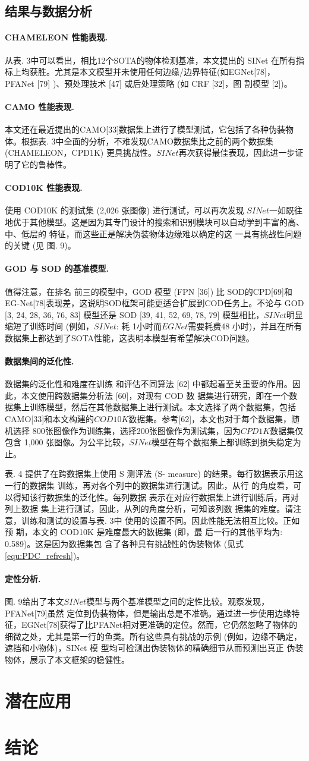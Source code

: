 \documentclass[final]{cvpr}
\newcommand{\mypara}[1]{\paragraph{#1.}}
\renewcommand{\equref}[1]{式\ref{#1}}
\begin{document}
\subsection{结果与数据分析}
\mypara{CHAMELEON 性能表现}从表. 3中可以看出，相比12个SOTA的物体检测基准，本文提出的 SINet 在所有指标上均获胜。尤其是本文模型并未使用任何边缘/边界特征(如EGNet[78]，PFANet [79] )、预处理技术 [47] 或后处理策略 (如 CRF [32]，图 割模型 [2])。
\mypara{CAMO 性能表现}本文还在最近提出的CAMO[33]数据集上进行了模型测试，它包括了各种伪装物 体。根据表. 3中全面的分析，不难发现CAMO数据集比之前的两个数据集 (CHAMELEON，CPD1K) 更具挑战性。$SINet$再次获得最佳表现，因此进一步证明了它的鲁棒性。
\mypara{COD10K 性能表现}使用 COD10K 的测试集 (2,026 张图像) 进行测试，可以再次发现 $SINet$一如既往地优于其他模型。这是因为其专门设计的搜索和识别模块可以自动学到丰富的高、中、低层的 特征，而这些正是解决伪装物体边缘难以确定的这 一具有挑战性问题的关键 (见 图. 9)。
\mypara{GOD 与 SOD 的基准模型}值得注意，在排名 前三的模型中，GOD 模型 (FPN [36]) 比 SOD的CPD[69]和EG-Net[78]表现差，这说明SOD框架可能更适合扩展到COD任务上。不论与 GOD [3, 24, 28, 36, 76, 83] 模型还是 SOD [39, 41, 52, 69, 78, 79]
模型相比，$SINet$明显缩短了训练时间 (例如，$SINet$: 耗 1小时而$EGNet$需要耗费48 小时)，并且在所有数据集上都达到了SOTA性能，这表明本模型有希望解决COD问题。
\mypara{数据集间的泛化性}数据集的泛化性和难度在训练 和评估不同算法 [62] 中都起着至关重要的作用。因 此，本文使用跨数据集分析法 [60]，对现有 COD 数 据集进行研究，即在一个数据集上训练模型，然后在其他数据集上进行测试。本文选择了两个数据集，包括 CAMO[33]和本文构建的$COD10K$数据集。参考[62]，本文也对于每个数据集，随机选择 800张图像作为训练集，选择200张图像作为测试集，因为$CPD1K$数据集仅包含 1,000 张图像。为公平比较，$SINet$模型在每个数据集上都训练到损失稳定为止。


表. 4 提供了在跨数据集上使用 S 测评法 (S-
measure) 的结果。每行数据表示用这一行的数据集 训练，再对各个列中的数据集进行测试。因此，从行 的角度看，可以得知该行数据集的泛化性。每列数据 表示在对应行数据集上进行训练后，再对列上数据 集上进行测试，因此，从列的角度分析，可知该列数 据集的难度。请注意，训练和测试的设置与表. 3中 使用的设置不同。因此性能无法相互比较。正如预 期，本文的 COD10K 是难度最大的数据集 (即，最 后一行的其他平均为: 0.589)。这是因为数据集包 含了各种具有挑战性的伪装物体 (见\equref{equ:PDC_refresh})。
\mypara{定性分析}图. 9给出了本文$SINet$模型与两个基准模型之间的定性比较。观察发现，PFANet[79]虽然 定位到伪装物体，但是输出总是不准确。通过进一步使用边缘特征，EGNet[78]获得了比PFANet相对更准确的定位。然而，它仍然忽略了物体的细微之处，尤其是第一行的鱼类。所有这些具有挑战的示例 (例如，边缘不确定，遮挡和小物体)，SINet 模 型均可检测出伪装物体的精确细节从而预测出真正 伪装物体，展示了本文框架的稳健性。
\section{潜在应用}\label{sec:Application_to_be_found}

\section{结论}\label{sec:Conclusion}




% 
% 

\end{document}
